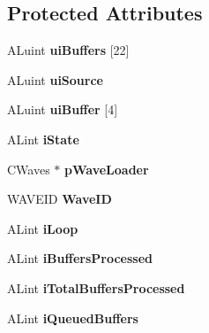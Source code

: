 \subsection*{Protected Attributes}
\begin{DoxyCompactItemize}
\item 
\hypertarget{class_s_o_u_n_d_a82282b535225836a84a31f8c182fe3d5}{
ALuint {\bfseries uiBuffers} \mbox{[}22\mbox{]}}
\label{class_s_o_u_n_d_a82282b535225836a84a31f8c182fe3d5}

\item 
\hypertarget{class_s_o_u_n_d_a5d7967b5208477b374a3880ae26ab77a}{
ALuint {\bfseries uiSource}}
\label{class_s_o_u_n_d_a5d7967b5208477b374a3880ae26ab77a}

\item 
\hypertarget{class_s_o_u_n_d_a127bcac3ce5726fa4b3196d44a24a825}{
ALuint {\bfseries uiBuffer} \mbox{[}4\mbox{]}}
\label{class_s_o_u_n_d_a127bcac3ce5726fa4b3196d44a24a825}

\item 
\hypertarget{class_s_o_u_n_d_a43be97d9ac6fd19cf7699ef9f5afbc70}{
ALint {\bfseries iState}}
\label{class_s_o_u_n_d_a43be97d9ac6fd19cf7699ef9f5afbc70}

\item 
\hypertarget{class_s_o_u_n_d_aa1d2c5db17651bd6cc2af4b8d076716f}{
CWaves $\ast$ {\bfseries pWaveLoader}}
\label{class_s_o_u_n_d_aa1d2c5db17651bd6cc2af4b8d076716f}

\item 
\hypertarget{class_s_o_u_n_d_aaf68e1f37c49cb40b7a61a4880aecebf}{
WAVEID {\bfseries WaveID}}
\label{class_s_o_u_n_d_aaf68e1f37c49cb40b7a61a4880aecebf}

\item 
\hypertarget{class_s_o_u_n_d_a2e69888846a58ab6f46dad631dedea47}{
ALint {\bfseries iLoop}}
\label{class_s_o_u_n_d_a2e69888846a58ab6f46dad631dedea47}

\item 
\hypertarget{class_s_o_u_n_d_afef36da1f658dfe7f616c1bba79d3590}{
ALint {\bfseries iBuffersProcessed}}
\label{class_s_o_u_n_d_afef36da1f658dfe7f616c1bba79d3590}

\item 
\hypertarget{class_s_o_u_n_d_a41a714322ff9041ccad9086d5cb01402}{
ALint {\bfseries iTotalBuffersProcessed}}
\label{class_s_o_u_n_d_a41a714322ff9041ccad9086d5cb01402}

\item 
\hypertarget{class_s_o_u_n_d_aa5eef80846dd17340ba3ee615c1c7f87}{
ALint {\bfseries iQueuedBuffers}}
\label{class_s_o_u_n_d_aa5eef80846dd17340ba3ee615c1c7f87}


\end{DoxyCompactItemize}
